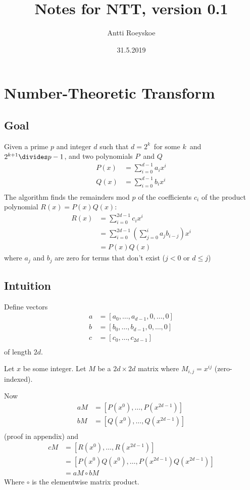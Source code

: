\documentclass{article}
\title{Notes for NTT, version 0.1}
\author{Antti Roeyskoe}
\date{31.5.2019}
\begin{document}
\begin{titlepage}
\maketitle
\end{titlepage}

\newpage

\section{Number-Theoretic Transform}
\subsection{Goal}
Given a prime $p$ and integer $d$ such that $d = 2^{k}$ for some $k$ and $2^{k+1} \divides p-1$, and two polynomials $P$ and $Q$
\begin{align*}
P(x) &= \sum_{i = 0}^{d-1} a_{i} x^{i}\\
Q(x) &= \sum_{i = 0}^{d-1} b_{i} x^{i}\\
\end{align*}
The algorithm finds the remainders mod $p$ of the coefficients $c_{i}$ of the product polynomial $R(x) = P(x)Q(x)$:
\begin{align*}
R(x)		&= \sum_{i = 0}^{2d-1} c_{i} x^{i}\\
		&= \sum_{i = 0}^{2d-1} \left(\sum_{j = 0}^{i} a_{j}b_{i-j}\right) x^{i}\\
		&= P(x)Q(x)
\end{align*}
where $a_{j}$ and $b_{j}$ are zero for terms that don't exist ($j < 0$ or $d \leq j$)

\subsection{Intuition}
Define vectors
\begin{align*}
a &= [a_{0}, \dots, a_{d-1}, 0, \dots, 0]\\
b &= [b_{0}, \dots, b_{d-1}, 0, \dots, 0]\\
c &= [c_{0}, \dots, c_{2d-1}]\\
\end{align*}
of length $2d$.

Let $x$ be some integer. Let $M$ be a $2d \times 2d$ matrix where $M_{i,j} = x^{ij}$ (zero-indexed).

Now
\begin{align*}
aM	&= [P(x^{0}), \dots, P(x^{2d-1})]\\
bM	&= [Q(x^{0}), \dots, Q(x^{2d-1})]\\
\end{align*}
(proof in appendix) and
\begin{align*}
cM	&= [R(x^{0}), \dots, R(x^{2d-1})]\\
	&= [P(x^{0})Q(x^{0}), \dots, P(x^{2d-1})Q(x^{2d-1})]\\
	&= aM \circ bM
\end{align*}
Where $\circ$ is the elementwise matrix product.
\end{document}
